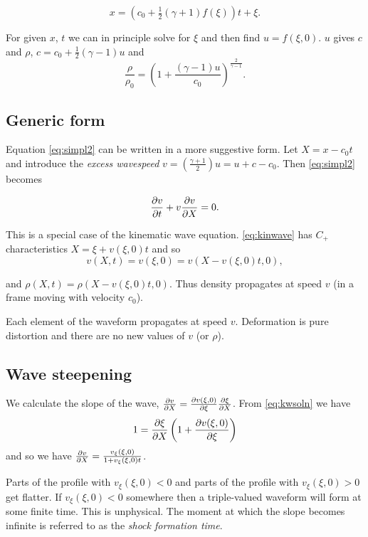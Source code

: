 \documentclass{notes}
\begin{document}
\begin{equation}\label{eq:simpsoln}
x = \left(c_0 + \tfrac{1}{2} (\gamma +1)f(\xi) \right)t + \xi.
\end{equation}

For given $x$, $t$ we can in principle solve for $\xi$ and then find
$u = f(\xi,0)$.  $u$ gives $c$ and $\rho$, $c = c_0 + \tfrac{1}{2}(\gamma - 1)
u$ and
\[
\frac{\rho}{\rho_0} = \left(1 + \frac{(\gamma - 1)u}{c_0}
\right)^{\frac{2}{\gamma-1}}.
\]

\subsection{Generic form}

Equation \eqref{eq:simpl2} can be written in a more suggestive form.
Let $X = x-c_0 t$ and introduce the \emph{excess wavespeed}
$v = \left( \tfrac{\gamma + 1}{2} \right)u = u + c - c_0$.
Then \eqref{eq:simpl2} becomes

\begin{equation}\label{eq:kinwave}
\frac{\partial v}{\partial t} + v \frac{\partial v}{\partial X} = 0.
\end{equation}

This is a special case of the kinematic wave equation.  \eqref{eq:kinwave}
has $C_+$ characteristics $X = \xi + v(\xi,0) t$ and so
\begin{equation}\label{eq:kwsoln}
v(X,t) = v(\xi,0)= v(X - v(\xi,0)t,0),
\end{equation}

and $\rho(X,t) = \rho(X - v(\xi,0)t,0)$.  Thus density propagates at
speed $v$ (in a frame moving with velocity $c_0$).

\vspace{2in}

Each element of the waveform propagates at speed $v$.  Deformation
is pure distortion and there are no new values of $v$ (or $\rho$).

\subsection{Wave steepening}

We calculate the slope of the wave, $\frac{\partial v}{\partial X}
= \frac{\partial v(\xi,0)}{\partial \xi} \frac{\partial \xi}{\partial X}$.  From \eqref{eq:kwsoln} we have
\[
1 = \frac{\partial \xi}{\partial X} \left( 1 + \frac{\partial v(\xi,0)}{\partial \xi} \right)
\]
and so we have $\frac{\partial v}{\partial X} = \frac{v_\xi(\xi,0)}{1 + v_\xi(\xi,0) t}$.

Parts of the profile with $v_\xi(\xi,0) < 0$ and parts of the profile with
$v_\xi(\xi,0) > 0$ get flatter.  If $v_\xi(\xi,0) < 0$ somewhere then
a triple-valued waveform will form at some finite time.  This is unphysical.
The moment at which the slope becomes infinite is referred to as the
\emph{shock formation time}.
\end{document}
